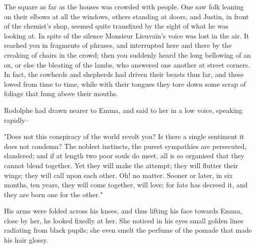 \documentclass[11pt,twocolumn]{ltugboat}
\begin{document}
The square as far as the houses was crowded with people. One saw folk
leaning on their elbows at all the windows, others standing at doors,
and Justin, in front of the chemist's shop, seemed quite transfixed by
the sight of what he was looking at. In spite of the silence Monsieur
Lieuvain's voice was lost in the air. It reached you in fragments of
phrases, and interrupted here and there by the creaking of chairs in the
crowd; then you suddenly heard the long bellowing of an ox, or else the
bleating of the lambs, who answered one another at street corners. In
fact, the cowherds and shepherds had driven their beasts thus far, and
these lowed from time to time, while with their tongues they tore down
some scrap of foliage that hung above their mouths.

Rodolphe had drawn nearer to Emma, and said to her in a low voice,
speaking rapidly--

"Does not this conspiracy of the world revolt you? Is there a single
sentiment it does not condemn? The noblest instincts, the purest
sympathies are persecuted, slandered; and if at length two poor souls do
meet, all is so organised that they cannot blend together. Yet they will
make the attempt; they will flutter their wings; they will call upon
each other. Oh! no matter. Sooner or later, in six months, ten years,
they will come together, will love; for fate has decreed it, and they
are born one for the other."

His arms were folded across his knees, and thus lifting his face towards
Emma, close by her, he looked fixedly at her. She noticed in his eyes
small golden lines radiating from black pupils; she even smelt the
perfume of the pomade that made his hair glossy.
\end{document}
